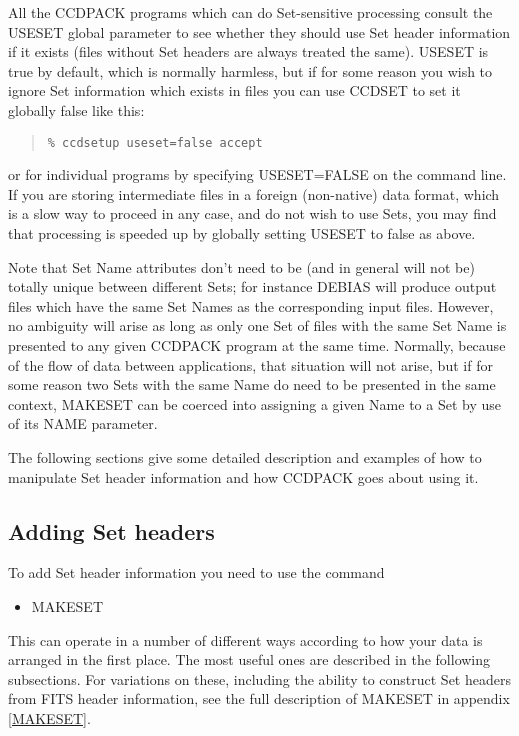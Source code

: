 \documentclass[twoside,11pt]{article}
\newcommand{\htmlref}[2]{#1}
\renewcommand{\_}{\texttt{\symbol{95}}}
\newenvironment{myquote}{\begin{quote}\begin{small}}{\end{small}\end{quote}}
\newcommand{\routine}[1]{{\sc #1}}
\newcommand{\xroutine}[1]{\htmlref{{\sc #1}}{#1}}
\begin{document}
All the CCDPACK programs which can do Set-sensitive processing
consult the USESET global parameter to see whether they should
use Set header information if it exists (files without Set headers are
always treated the same).
USESET is true by default, which is normally harmless, 
but if for some reason you wish to ignore Set information
which exists in files you can use \xroutine{CCDSET} to set it
globally false like this:
\begin{myquote}
\begin{verbatim}
% ccdsetup useset=false accept
\end{verbatim}
\end{myquote}
or for individual programs by specifying USESET=FALSE on the command line.
If you are storing intermediate files in a foreign (non-native)
data format, which is a slow way to proceed in any case,
and do not wish to use Sets, you may find that processing is speeded
up by globally setting USESET to false as above.

Note that Set Name attributes don't need to be (and in general will not be)
totally unique between different Sets; for instance \routine{DEBIAS}
will produce output files which have the same Set Names 
as the corresponding input files.  However, no ambiguity will arise
as long as only one Set of files with the same Set Name is presented
to any given CCDPACK program at the same time. 
Normally, because of the flow of
data between applications, that situation will not arise, 
but if for some reason two Sets with the same Name do need to be
presented in the same context, \xroutine{MAKESET} can be coerced into
assigning a given Name to a Set by use of its NAME parameter.

The following sections give some detailed description and examples of
how to manipulate Set
header information and how CCDPACK goes about using it.


\subsection{Adding Set headers}

To add Set header information you need to use the command
\begin{itemize}
\item \xroutine{MAKESET}
\end{itemize}
This can operate in a number of different ways according to 
how your data is arranged in the first place.
The most useful ones are described in the following subsections.
For variations on these, including the ability to construct
Set headers from FITS header information, see the full description
of \routine{MAKESET} in appendix \ref{MAKESET}.
\end{document}
